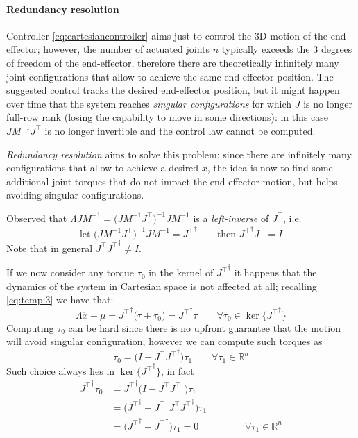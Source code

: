 	\paragraph{Redundancy resolution} Controller \eqref{eq:cartesiancontroller} aims just to control the 3D motion of the end-effector; however, the number of actuated joints $n$ typically exceeds the 3 degrees of freedom of the end-effector, therefore there are theoretically infinitely many joint configurations that allow to achieve the same end-effector position. The suggested control tracks the desired end-effector position, but it might happen over time that the system reaches \textit{singular configurations} for which $J$ is no longer full-row rank (losing the capability to move in some directions): in this case $JM^{-1}J^\top$ is no longer invertible and the control law cannot be computed.
	
	\textit{Redundancy resolution} aims to solve this problem: since there are infinitely many configurations that allow to achieve a desired $x$, the idea is now to find some additional joint torques that do not impact the end-effector motion, but helps avoiding singular configurations.
	
	Observed that $\Lambda JM^{-1} = \big(JM^{-1}J^\top\big)^{-1}JM^{-1}$ is a \textit{left-inverse} of $J^\top$, i.e. 
	\[ \textrm{let } \big(JM^{-1}J^\top\big)^{-1}JM^{-1} = {J^\top}^\dagger \qquad \textrm{then } {J^\top}^\dagger J^\top = I \]
	Note that in general $J^\top {J^\top}^\dagger \neq I$.
	
	If we now consider any torque $\tau_0$ in the kernel of ${J^\top}^\dagger$ it happens that the dynamics of the system in Cartesian space is not affected at all; recalling \eqref{eq:temp:3} we have that:
	\[ \Lambda \ddot x + \mu = {J^\top}^\dagger\big(\tau + \tau_0\big) = {J^\top}^\dagger \tau \qquad \forall \tau_0 \in \ker\{{J^\top}^\dagger\} \]
	Computing $\tau_0$ can be hard since there is no upfront guarantee that the motion will avoid singular configuration, however we can compute such torques as
	\[ \tau_0 = \big(I - J^\top {J^\top}^\dagger \big) \tau_1 \qquad \forall \tau_1 \in \mathds R^n \]
	Such choice always lies in $\ker\{{J^\top}^\dagger\}$, in fact
	\begin{align*}
		{J^\top}^\dagger \tau_0 & = {J^\top}^\dagger \big(I - J^\top {J^\top}^\dagger\big) \tau_1 \\
		& = \big({J^\top}^\dagger - {J^\top}^\dagger J^\top {J^\top}^\dagger\big) \tau_1 \\
		& = \big({J^\top}^\dagger - {J^\top}^\dagger\big) \tau_1 = 0 \hspace{2cm} \forall \tau_1 \in \mathds R^n
	\end{align*}


